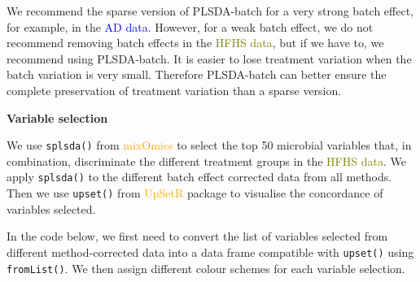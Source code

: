 \documentclass[
]{book}
\begin{document}
We recommend the sparse version of PLSDA-batch for a very strong batch effect, for example, in the \textcolor{blue}{AD data}. However, for a weak batch effect, we do not recommend removing batch effects in the \textcolor{olive}{HFHS data}, but if we have to, we recommend using PLSDA-batch. It is easier to lose treatment variation when the batch variation is very small. Therefore PLSDA-batch can better ensure the complete preservation of treatment variation than a sparse version.

\textbf{Variable selection}

We use \texttt{splsda()} from \textcolor{orange}{mixOmics} to select the top 50 microbial variables that, in combination, discriminate the different treatment groups in the \textcolor{olive}{HFHS data}. We apply \texttt{splsda()} to the different batch effect corrected data from all methods. Then we use \texttt{upset()} from \textcolor{orange}{UpSetR} package \citep{lex2014upset} to visualise the concordance of variables selected.

In the code below, we first need to convert the list of variables selected from different method-corrected data into a data frame compatible with \texttt{upset()} using \texttt{fromList()}. We then assign different colour schemes for each variable selection.
\end{document}
